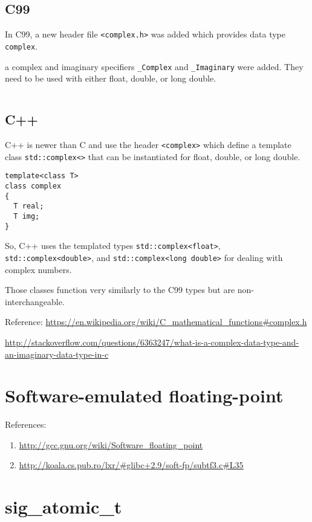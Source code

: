 \subsection{C99}
\label{sec:complex-C}

In C99, a new header file \verb!<complex.h>! was added which provides 
data type \verb!complex!.

a complex and imaginary specifiers \verb!_Complex! and \verb!_Imaginary!
were added. They need to be used with either float, double, or long double.
\begin{lstlisting}

\end{lstlisting}

\subsection{C++}
\label{sec:complex-C++}

C++ is newer than C and use the header \verb!<complex>! which define a template
class \verb!std::complex<>! that can be instantiated for float, double, or long
double.

\begin{lstlisting}
template<class T>
class complex
{
  T real;
  T img;
}
\end{lstlisting}
So, C++ uses the templated types \verb!std::complex<float>!,
\verb!std::complex<double>!, and \verb!std::complex<long double>! for dealing
with complex numbers. 

Those classes function very similarly to the C99 types but are
non-interchangeable.

Reference:
\url{https://en.wikipedia.org/wiki/C_mathematical_functions#complex.h}

\url{http://stackoverflow.com/questions/6363247/what-is-a-complex-data-type-and-an-imaginary-data-type-in-c}

\section{Software-emulated floating-point}

References:
\begin{enumerate}
  \item \url{http://gcc.gnu.org/wiki/Software_floating_point}
  \item \url{http://koala.cs.pub.ro/lxr/#glibc+2.9/soft-fp/subtf3.c#L35}
\end{enumerate}

\section{sig\_atomic\_t}
\label{sec:sig_atomic_t}

